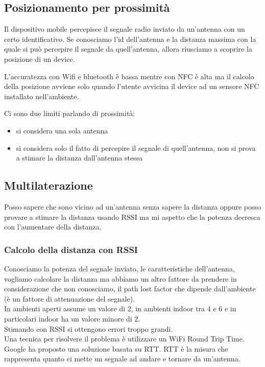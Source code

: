 \subsection{Posizionamento per prossimità}
Il dispositivo mobile percepisce il segnale radio inviato da un'antenna con un certo identificativo. 
Se conosciamo l'id dell'antenna e la distanza massima con la quale si può percepire il segnale da quell'antenna, allora riusciamo a scoprire la posizione di un device. 

L'accuratezza con Wifi e bluetooth è bassa mentre con NFC è alta ma il calcolo della posizione avviene solo quando l'utente avvicina il device ad un sensore NFC installato nell'ambiente.

Ci sono due limiti parlando di prossimità:
\begin{itemize}
    \item si considera una sola antenna
    \item si considera solo il fatto di percepire il segnale di quell'antenna, non si prova a stimare la distanza dall'antenna stessa
\end{itemize} 

\subsection{Multilaterazione}
Posso sapere che sono vicino ad un'antenna senza sapere la distanza oppure posso provare a stimare la distanza usando RSSI ma mi aspetto che la potenza decresca con l'aumentare della distanza.

\subsubsection{Calcolo della distanza con RSSI}
Conosciamo la potenza del segnale inviato, le caratteristiche dell'antenna, vogliamo calcolare la distanza ma abbiamo un altro fattore da prendere in considerazione che non conosciamo, il path lost factor che dipende dall'ambiente (è un fattore di attenuazione del segnale). 
\\ In ambienti aperti assume un valore di 2, in ambienti indoor tra 4 e 6 e in particolari indoor ha un valore minore di 2. 
\\ Stimando con RSSI si ottengono errori troppo grandi.
\\ Una tecnica per risolvere il problema è utilizzare un WiFi Round Trip Time.
\\ Google ha proposto una soluzione basata su RTT. 
RTT è la misura che rappresenta quanto ci mette un segnale ad andare e tornare da un'antenna. 

